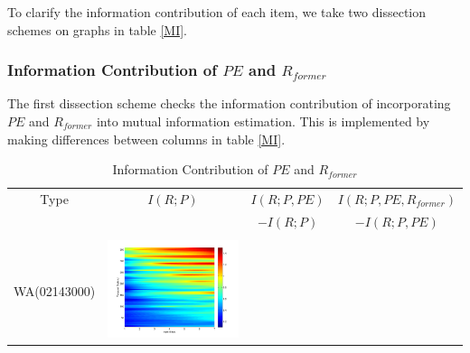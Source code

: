 \documentclass[11pt]{article}
\begin{document}
To clarify the information contribution of each item, 
we take two dissection schemes on graphs in table \ref{MI}.%
 
\subsubsection{Information Contribution of $PE$ and $R_{former}$}
The first dissection scheme checks the information contribution of incorporating $PE$ and $R_{former}$ into mutual information estimation. This is implemented by making differences between columns in table \ref{MI}.
\begin{table}[H]\small
\caption{Information Contribution of $PE$ and $R_{former}$}
\label{PER}
\resizebox{\textwidth}{!}
{
\centering
\begin{tabular}{cccc}
\toprule
Type&$I(R;P)$&$I(R;P,PE) $&$I(R;P,PE,R_{former}) $\\
 & &$ -I(R;P)$&$ -I(R;P,PE)$\\\hline
\\
WA(02143000)
&\begin{minipage}{.3\textwidth}\includegraphics[width=\linewidth]{resultgraph/02143000p.png}\end{minipage}

\end{tabular}}
\end{table}
\end{document}
